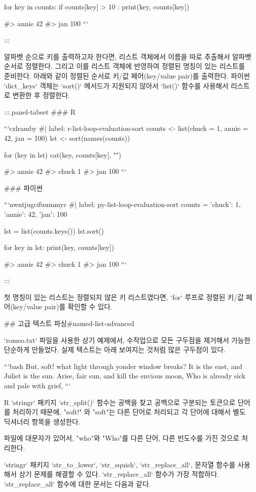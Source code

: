 \documentclass[
  letterpaper,
]{book}
\begin{document}
{for key in counts:
  if counts[key] > 10 :
    print(key, counts[key])

#> annie 42
#> jan 100
```

:::

알파벳 순으로 키를 출력하고자 한다면, 리스트 객체에서 이름을 따로 추출해서 알파벳순서로 정렬한다. 
그리고 이를 리스트 객체에 반영하여 정렬된 명칭이 있는 리스트를 준비한다. 
아래와 같이 정렬된 순서로 키/값 페어(key/value pair)를 출력한다. 
파이썬 `dict_keys` 객체는 `sort()` 메서드가 지원되지 않아서 `list()` 함수를 사용해서 리스트로 변환한 후 정렬한다.

:::{.panel-tabset}
### R 

```czlramby
#| label: r-list-loop-evaluation-sort
counts <- list(chuck = 1, annie = 42, jan = 100)
lst <- sort(names(counts))

for (key in lst) {
    cat(key, counts[key], "\n")
}

#> annie 42
#> chuck 1
#> jan 100
```

### 파이썬

```nwntjugcifuummyc
#| label: py-list-loop-evaluation-sort
counts = {'chuck': 1, 'annie': 42, 'jan': 100}

lst = list(counts.keys()) 
lst.sort()

for key in lst:
    print(key, counts[key])

#> annie 42
#> chuck 1
#> jan 100
```

:::

첫 명칭이 있는 리스트는 정렬되지 않은 키 리스트였다면, 
`for` 루프로 정렬된 키/값 페어(key/value pair)를 확인할 수 있다.

## 고급 텍스트 파싱{#named-list-advanced}

`romeo.txt` 파일을 사용한 상기 예제에서, 수작업으로 모든 구두점을
제거해서 가능한 단순하게 만들었다. 실제 텍스트는 아래 보여지는 것처럼
많은 구두점이 있다.

```bash
But, soft! what light through yonder window breaks?
It is the east, and Juliet is the sun.
Arise, fair sun, and kill the envious moon,
Who is already sick and pale with grief,
```

R `stringr` 패키지 `str_split()` 함수는 공백을 찾고 공백으로 구분되는 토큰으로 단어를 처리하기 때문에, 
"soft!" 와 "soft"는 다른 단어로 처리되고 각 단어에 대해서 별도 딕셔너리 항목을 생성한다.

파일에 대문자가 있어서, "who"와 "Who"를 다른 단어, 다른 빈도수를 가진 것으로 처리한다.

`stringr` 패키지 `str_to_lower`, `str_squish`, `str_replace_all`, 문자열 함수를 사용해서 상기 문제를 해결할 수 있다. 
`str_replace_all` 함수가 가장 적합하다. `str_replace_all` 함수에 대한 문서는 다음과 같다.



}
\end{document}
